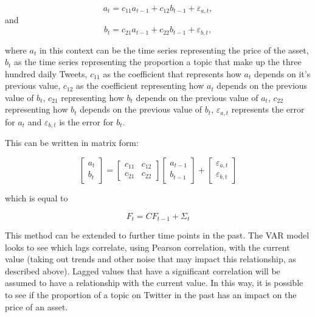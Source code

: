 \documentclass[
]{article}
\begin{document}
\begin{equation}
a_t = c_{11}a_{t-1} + c_{12}b_{t-1} + \varepsilon_{a,t}, 
\end{equation} and \begin{equation}
b_t = c_{21}a_{t-1} + c_{22}b_{t-1} + \varepsilon_{b,t},
\end{equation}

where \(a_t\) in this context can be the time series representing the
price of the asset, \(b_t\) as the time series representing the
proportion a topic that make up the three hundred daily Tweets,
\(c_{11}\) as the coefficient that represents how \(a_t\) depends on
it's previous value, \(c_{12}\) as the coefficient representing how
\(a_t\) depends on the previous value of \(b_t\), \(c_{21}\)
representing how \(b_t\) depends on the previous value of \(a_t\),
\(c_{22}\) representing how \(b_t\) depends on the previous value of
\(b_t\), \(\varepsilon_{a,t}\) represents the error for \(a_t\) and
\(\varepsilon_{b,t}\) is the error for \(b_t\).

This can be written in matrix form:

\begin{equation}
\begin{bmatrix} 
a_t\\ 
b_t
\end{bmatrix} = \begin{bmatrix}
c_{11} & c_{12} \\ 
c_{21} & c_{22}
\end{bmatrix}
\begin{bmatrix} 
a_{t-1}\\ 
b_{t-1}
\end{bmatrix} +
\begin{bmatrix} 
\varepsilon_{a,t}\\ 
\varepsilon_{b,t}
\end{bmatrix}
\end{equation}

which is equal to

\begin{equation}
F_t = CF_{t-1} + \Sigma_t
\end{equation}

This method can be extended to further time points in the past. The VAR
model looks to see which lags correlate, using Pearson correlation, with
the current value (taking out trends and other noise that may impact
this relationship, as described above). Lagged values that have a
significant correlation will be assumed to have a relationship with the
current value. In this way, it is possible to see if the proportion of a
topic on Twitter in the past has an impact on the price of an asset.
\end{document}
